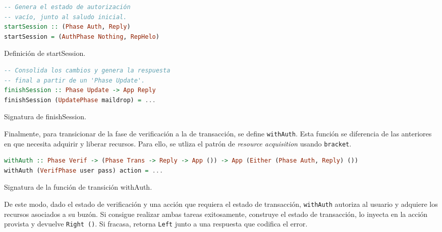 \documentclass[a4paper]{CSMakotoTechnicalReport}
\begin{document}
\vspace{-16pt}
\begin{minipage}[t]{0.47\textwidth}
\begin{lstlisting}[language=Haskell, frame=none, numbers=none, basicstyle=\footnotesize]
-- Genera el estado de autorización
-- vacío, junto al saludo inicial.
startSession :: (Phase Auth, Reply)
startSession = (AuthPhase Nothing, RepHelo)
\end{lstlisting}
\vspace{-4pt}
\captionsetup{type=lstlisting}
\caption{Definición de startSession.}
\end{minipage}
\hfill
\begin{minipage}[t]{0.47\textwidth}
\begin{lstlisting}[language=Haskell, frame=none, numbers=none, basicstyle=\footnotesize]
-- Consolida los cambios y genera la respuesta
-- final a partir de un 'Phase Update'.
finishSession :: Phase Update -> App Reply
finishSession (UpdatePhase maildrop) = ...
\end{lstlisting}
\vspace{-4pt}
\captionsetup{type=lstlisting}
\caption{Signatura de finishSession.}
\end{minipage}
\vspace{10pt}

Finalmente, para transicionar de la fase de verificación a la de transacción, se define \texttt{withAuth}. Esta función se diferencia de las anteriores en que necesita adquirir y liberar recursos. Para ello, se utliza el patrón de \textit{resource acquisition} usando \texttt{bracket}.

\vspace{-8pt}
\begin{minipage}{\linewidth}
\begin{lstlisting}[language=Haskell, frame=none, numbers=none, basicstyle=\footnotesize]
withAuth :: Phase Verif -> (Phase Trans -> Reply -> App ()) -> App (Either (Phase Auth, Reply) ())
withAuth (VerifPhase user pass) action = ...
\end{lstlisting}
\captionsetup{type=lstlisting}
\caption{Signatura de la función de transición withAuth.}
\end{minipage}
\vspace{6pt}

De este modo, dado el estado de verificación y una acción que requiera el estado de transacción, \texttt{withAuth} autoriza al usuario y adquiere los recursos asociados a su buzón. Si consigue realizar ambas tareas exitosamente, construye el estado de transacción, lo inyecta en la acción provista y devuelve \texttt{Right ()}. Si fracasa, retorna \texttt{Left} junto a una respuesta que codifica el error.
\end{document}
